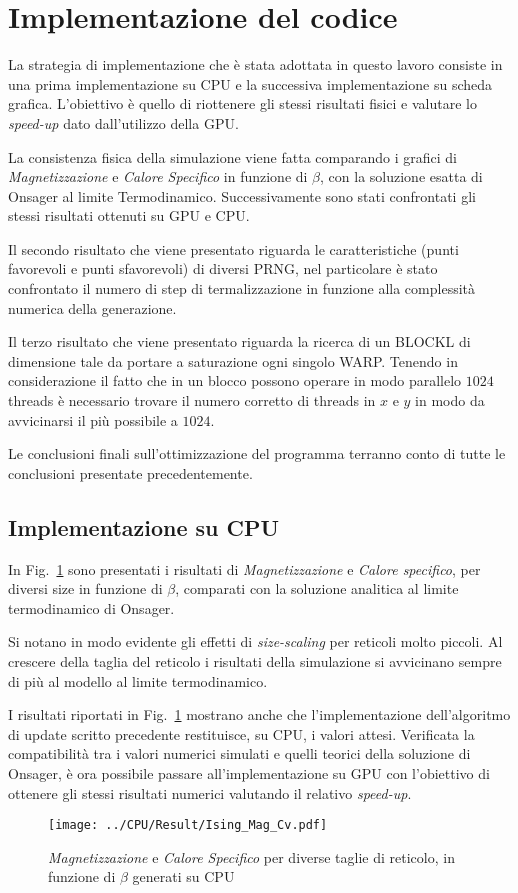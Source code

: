 \documentclass[a4paper,12pt]{article}
\begin{document}
\section{Implementazione del codice}
La strategia di implementazione che \`e stata adottata in questo lavoro consiste in una prima implementazione su CPU e la successiva implementazione su scheda grafica. L'obiettivo \`e quello di riottenere gli stessi risultati fisici e valutare lo \emph{speed-up} dato dall'utilizzo della GPU. 

La consistenza fisica della simulazione viene fatta comparando i grafici di \emph{Magnetizzazione} e \emph{Calore Specifico} in funzione di $\beta$, con la soluzione esatta di Onsager al limite Termodinamico. Successivamente sono stati confrontati gli stessi risultati ottenuti su GPU e CPU. 

Il secondo risultato che viene presentato riguarda le caratteristiche (punti favorevoli e punti sfavorevoli) di diversi PRNG, nel particolare \`e stato confrontato il numero di step di termalizzazione in funzione alla complessit\`a numerica della generazione. 

Il terzo risultato che viene presentato riguarda la ricerca di un BLOCKL di dimensione tale da portare a saturazione ogni singolo WARP. Tenendo in considerazione il fatto che in un blocco possono operare in modo parallelo $1024$ threads \`e necessario trovare il numero corretto di threads in $x$ e $y$ in modo da avvicinarsi il pi\`u possibile a $1024$.

Le conclusioni finali sull'ottimizzazione del programma terranno conto di tutte le conclusioni presentate precedentemente.

\subsection{Implementazione su CPU}
In Fig.~\ref{figura:CPU} sono presentati i risultati di \emph{Magnetizzazione} e \emph{Calore specifico}, per diversi size in funzione di $\beta$, comparati con la soluzione analitica al limite termodinamico di Onsager.

Si notano in modo evidente gli effetti di \emph{size-scaling} per reticoli molto piccoli. Al crescere della taglia del reticolo i risultati della simulazione si avvicinano sempre di pi\`u al modello al limite termodinamico.

I risultati riportati in Fig.~\ref{figura:CPU} mostrano anche che l'implementazione dell'algoritmo di update scritto precedente restituisce, su CPU, i valori attesi. Verificata la compatibilit\`a tra i valori numerici simulati e quelli teorici della soluzione di Onsager, \`e ora possibile passare all'implementazione su GPU con l'obiettivo di ottenere gli stessi risultati numerici valutando il relativo \emph{speed-up}.
\begin{figure}
	\centering
		\texttt{[image: ../CPU/Result/Ising\_Mag\_Cv.pdf]}
		\caption{\emph{Magnetizzazione} e \emph{Calore Specifico} per diverse taglie di reticolo, in funzione di $\beta$ generati su CPU}
		\label{figura:CPU}
\end{figure}
\end{document}
